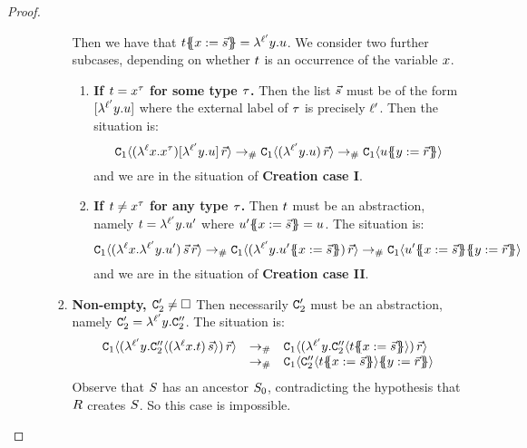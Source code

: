 \begin{proof}
\begin{enumerate}
\begin{enumerate}
\begin{enumerate}
      Then we have that $t\{\!\!\{x := \vec{s}\}\!\!\} = \lambda^{\ell'} y. u$.
      We consider two further subcases, depending on whether $t$ is an occurrence of the variable $x$.
      \begin{enumerate}
      \item {\bf If $t = x^{\tau}$ for some type $\tau$.}
        Then the list $\vec{s}$ must be of the form $[\lambda^{\ell'} y. u]$
        where the external label of $\tau$ is precisely $\ell'$.
        Then the situation is:
        \[
          \mathtt{C}_1\langle(\lambda^{\ell} x. x^{\tau})[\lambda^{\ell'} y. u]\,\vec{r}\rangle
          \mathrel{\to_{\mathtt{\#}}}
          \mathtt{C}_1\langle(\lambda^{\ell'} y. u)\,\vec{r}\rangle
          \mathrel{\to_{\mathtt{\#}}}
          \mathtt{C}_1\langle u\{\!\!\{y := \vec{r}\}\!\!\}\rangle
        \]
        and we are in the situation of {\bf Creation case I}.
      \item {\bf If $t \neq x^{\tau}$ for any type $\tau$.}
        Then $t$ must be an abstraction, namely $t = \lambda^{\ell'} y. u'$
        where $u'\{\!\!\{x := \vec{s}\}\!\!\} = u$. 
        The situation is:
        \[
          \con_1\of{(\lamp{\lab}{\var}{\lamp{\labtwo}{\vartwo}{\tmthree'}})\,\ls{\tmtwo}\,\ls{\tmfour}}
          \todist
          \con_1\of{(\lamp{\labtwo}{\vartwo}{\tmthree'\sub{\var}{\ls{\tmtwo}}})\,\ls{\tmfour}}
          \todist
          \con_1\of{\tmthree'\sub{\var}{\ls{\tmtwo}}\sub{\vartwo}{\ls{\tmfour}}}
        \]
        and we are in the situation of {\bf Creation case II}.
      \end{enumerate}
    \item {\bf Non-empty, $\mathtt{C}'_2 \neq \Box$}
      Then necessarily $\mathtt{C}'_2$ must be an abstraction, namely $\mathtt{C}'_2 = \lambda^{\ell'} y. \mathtt{C}''_2$.
      The situation is:
      \[
        \begin{array}{rcl}
        \con_1\of{(\lamp{\labtwo}{\vartwo}{\con''_2\of{ (\lamp{\lab}{\var}{\tm})\,\ls{\tmtwo} }})\,\ls{\tmfour}}
        & \todist &
        \con_1\of{(\lamp{\labtwo}{\vartwo}{\con''_2\of{ \tm\sub{\var}{\ls{\tmtwo}} }})\,\ls{\tmfour}}
        \\
        & \todist &
        \con_1\of{\con''_2\of{ \tm\sub{\var}{\ls{\tmtwo}} }\sub{\vartwo}{\ls{\tmfour}}}
        \end{array}
      \]
      Observe that $S$ has an ancestor $S_0$, contradicting the hypothesis that $R$ creates $S$.
      So this case is impossible.
    \end{enumerate}

\end{enumerate}
\end{enumerate}
\end{proof}
